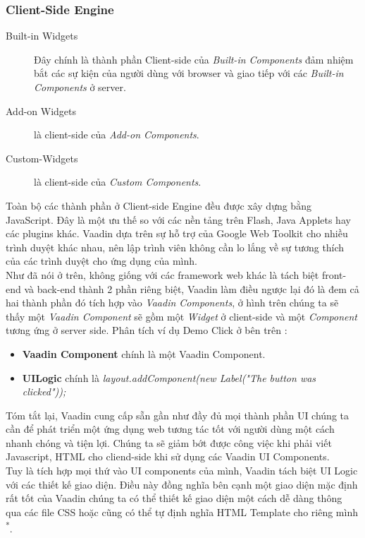 \subsubsection{Client-Side Engine}
\begin{description}
\item[Built-in Widgets] Đây chính là thành phần Client-side của \textit{Built-in Components} đảm nhiệm bắt các sự kiện của người dùng với browser và giao tiếp với các \textit{Built-in Components} ở server.
\item[Add-on Widgets] là client-side của \textit{Add-on Components}.
\item[Custom-Widgets] là client-side của \textit{Custom Components}.
\end{description}
Toàn bộ các thành phần ở Client-side Engine đều được xây dựng bằng JavaScript. Đây là một ưu thế so với các nền tảng trên Flash, Java Applets hay các plugins khác. Vaadin dựa trên sự hỗ trợ của Google Web Toolkit cho nhiều trình duyệt khác nhau, nên lập trình viên không cần lo lắng về sự tương thích của các trình duyệt cho ứng dụng của mình.
\\
Như đã nói ở trên, không giống với các framework web khác là tách biệt front-end và back-end thành 2 phần riêng biệt, Vaadin làm điều ngược lại đó là đem cả hai thành phần đó tích hợp vào \textit{Vaadin Components}, ở hình trên chúng ta sẽ thấy một \textit{Vaadin Component} sẽ gồm một \textit{Widget} ở client-side  và một \textit{Component} tương ứng ở server side. Phân tích ví dụ Demo Click ở bên trên :
\begin{itemize}
\item \textbf{Vaadin Component} chính là một Vaadin Component.
\item \textbf{UILogic} chính là \textit{layout.addComponent(new Label("The button was clicked"));}
\end{itemize}

Tóm tắt lại, Vaadin cung cấp sẵn gần như đầy đủ mọi thành phần UI chúng ta cần để phát triển một ứng dụng web tương tác tốt với người dùng một cách nhanh chóng và tiện lợi. Chúng ta sẽ giảm bớt được công việc khi phải viết Javascript, HTML cho cliend-side khi sử dụng các Vaadin UI Components.
\\
Tuy là tích hợp mọi thứ vào UI components của mình, Vaadin tách biệt UI Logic với các thiết kế giao diện. Điều này đồng nghĩa bên cạnh một giao diện mặc định rất tốt của Vaadin chúng ta có thể thiết kế giao diện một cách dễ dàng thông qua các file CSS hoặc cũng có thể tự định nghĩa HTML Template cho riêng mình \textsuperscript{*}. 
{\let\thefootnote\relax{}
}


